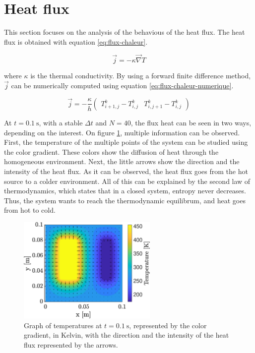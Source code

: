 \documentclass[a4paper,12pt,twoside]{article}
\begin{document}
\section{Heat flux}
This section focuses on the analysis of the behavious of the heat flux.
The heat flux is obtained with equation \eqref{eq:flux-chaleur}.

\begin{equation}
  \vec{j} = -\kappa\vec{\nabla} T
  \label{eq:flux-chaleur}
\end{equation}

where $\kappa$ is the thermal conductivity.
By using a forward finite difference method, $\vec{j}$ can be numerically computed using equation \eqref{eq:flux-chaleur-numerique}.

\begin{equation}
  \vec{j} = -\frac{\kappa}{h}
  \begin{pmatrix}
    T^k_{i+1,j} - T^k_{i,j} & T^k_{i,j+1} - T^k_{i,j}
  \end{pmatrix}
  \label{eq:flux-chaleur-numerique}
\end{equation}

At $t=\SI{0.1}{\s}$, with a stable $\Delta t$ and $N=40$, the flux heat can be seen in two ways, depending on the interest.
On figure \ref{fig:c-temp}, multiple information can be observed.
First, the temperature of the multiple points of the system can be studied using the color gradient.
These colors show the diffusion of heat through the homogeneous environment.
Next, the little arrows show the direction and the intensity of the heat flux.
As it can be observed, the heat flux goes from the hot source to a colder environment.
All of this can be explained by the second law of thermodynamics, which states that in a closed system, entropy never decreases. \cite{wiki:2nd-law}
Thus, the system wants to reach the thermodynamic equilibrum, and heat goes from hot to cold. %


\begin{figure}[h]
  \centering
  \includegraphics[width=0.6\textwidth]{graphs/c_temp.eps}
  \caption{Graph of temperatures at $t=\SI{0.1}{\s}$, represented by the color gradient, in Kelvin, with the direction and the intensity of the heat flux represented by the arrows.}
  \label{fig:c-temp}
\end{figure}
\end{document}
